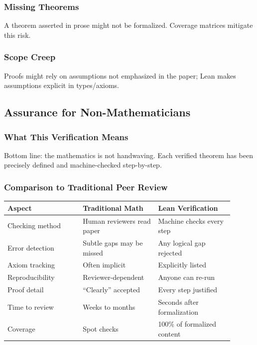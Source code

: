 \subsubsection{Missing Theorems}
A theorem asserted in prose might not be formalized. Coverage matrices mitigate this risk.

\subsubsection{Scope Creep}
Proofs might rely on assumptions not emphasized in the paper; Lean makes assumptions explicit in types/axioms.

\subsection{Assurance for Non-Mathematicians}

\subsubsection{What This Verification Means}
Bottom line: the mathematics is not handwaving. Each verified theorem has been precisely defined and machine-checked step-by-step.

\subsubsection{Comparison to Traditional Peer Review}
\begin{table}[h]
\centering
\begin{tabular}{p{0.30\linewidth}p{0.30\linewidth}p{0.30\linewidth}}
\hline
\textbf{Aspect} & \textbf{Traditional Math} & \textbf{Lean Verification} \\
\hline
Checking method & Human reviewers read paper & Machine checks every step \\
Error detection & Subtle gaps may be missed & Any logical gap rejected \\
Axiom tracking & Often implicit & Explicitly listed \\
Reproducibility & Reviewer-dependent & Anyone can re-run \\
Proof detail & ``Clearly'' accepted & Every step justified \\
Time to review & Weeks to months & Seconds after formalization \\
Coverage & Spot checks & 100\% of formalized content \\
\hline
\end{tabular}
\end{table}

